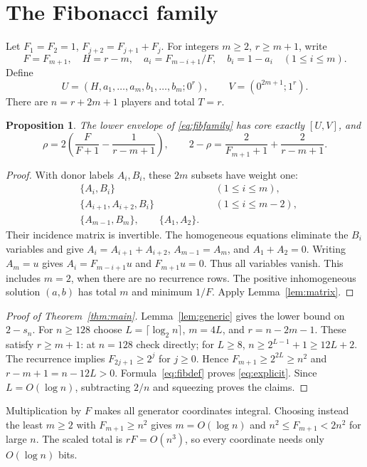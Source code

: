 \documentclass[11pt]{article}
\newtheorem{proposition}[theorem]{Proposition}
\begin{document}
\section{The Fibonacci family}
Let $F_1=F_2=1$, $F_{j+2}=F_{j+1}+F_j$. For integers $m\ge2$,
$r\ge m+1$, write
\[
 F=F_{m+1},\quad H=r-m,\quad
 a_i=F_{m-i+1}/F,\quad b_i=1-a_i\quad(1\le i\le m).
\]
Define
\begin{equation}\label{eq:fibfamily}
 U=(H,a_1,\ldots,a_m,b_1,\ldots,b_m;0^r),\qquad
 V=(0^{2m+1};1^r).
\end{equation}
There are $n=r+2m+1$ players and total $T=r$.
\begin{proposition}\label{prop:fib}
The lower envelope of \eqref{eq:fibfamily} has core exactly $[U,V]$, and
\begin{equation}\label{eq:fibdef}
 \rho=2\left(\frac F{F+1}-\frac1{r-m+1}\right),\qquad
 2-\rho=\frac2{F_{m+1}+1}+\frac2{r-m+1}.
\end{equation}
\end{proposition}
\begin{proof}
With donor labels $A_i,B_i$, these $2m$ subsets have weight one:
\begin{align*}
 &\{A_i,B_i\} &&(1\le i\le m),\\
 &\{A_{i+1},A_{i+2},B_i\} &&(1\le i\le m-2),\\
 &\{A_{m-1},B_m\},\qquad \{A_1,A_2\}.&&
\end{align*}
Their incidence matrix is invertible. The homogeneous equations eliminate
the $B_i$ variables and give $A_i=A_{i+1}+A_{i+2}$,
$A_{m-1}=A_m$, and $A_1+A_2=0$. Writing $A_m=u$ gives
$A_i=F_{m-i+1}u$ and $F_{m+1}u=0$. Thus all variables vanish.
This includes $m=2$, when there are no recurrence rows.
The positive inhomogeneous solution $(a,b)$ has total $m$ and minimum
$1/F$. Apply Lemma~\ref{lem:matrix}.
\end{proof}
\begin{proof}[Proof of Theorem~\ref{thm:main}]
Lemma~\ref{lem:generic} gives the lower bound on $2-s_n$.
For $n\ge128$ choose $L=\lceil\log_2n\rceil$, $m=4L$, and
$r=n-2m-1$. These satisfy $r\ge m+1$: at $n=128$ check directly;
for $L\ge8$, $n\ge2^{L-1}+1\ge12L+2$. The recurrence implies
$F_{2j+1}\ge2^j$ for $j\ge0$. Hence
$F_{m+1}\ge2^{2L}\ge n^2$ and $r-m+1=n-12L>0$.
Formula~\eqref{eq:fibdef} proves \eqref{eq:explicit}.
Since $L=O(\log n)$, subtracting $2/n$ and squeezing proves the claims.
\end{proof}
Multiplication by $F$ makes all generator coordinates integral. Choosing
instead the least $m\ge2$ with $F_{m+1}\ge n^2$ gives
$m=O(\log n)$ and $n^2\le F_{m+1}<2n^2$ for large $n$. The scaled total
is $rF=O(n^3)$, so every coordinate needs only $O(\log n)$ bits.
\end{document}
